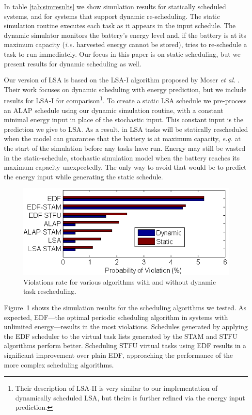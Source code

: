 In table \ref{tab:simresults} we show simulation results for statically scheduled systems, and for systems that support dynamic re-scheduling.  The static simulation routine executes each task as it appears in the input schedule.  The dynamic simulator monitors the battery's energy level and, if the battery is at its maximum capacity (\emph{i.e.} harvested energy cannot be stored), tries to re-schedule a task to run immediately.  Our focus in this paper is on static scheduling, but we present results for dynamic scheduling as well.

Our version of \textsc{LSA} is based on the \textsc{LSA-I} algorithm proposed by Moser \emph{et al.} \cite{moser2007real}.  Their work focuses on dynamic scheduling with energy prediction, but we include results for \textsc{LSA-I} for comparison\footnote{Their description of \textsc{LSA-II} is very similar to our implementation of dynamically scheduled \textsc{LSA}, but theirs is further refined via the energy input prediction.}.  To create a static \textsc{LSA} schedule we pre-process an \textsc{ALAP} schedule using our dynamic simulation routine, with a constant minimal energy input in place of the stochastic input.  This constant input is the prediction we give to \textsc{LSA}.  As a result, in \textsc{LSA} tasks will be statically rescheduled when the model can guarantee that the battery is at maximum capacity, \emph{e.g.} at the start of the simulation before any tasks have run.  Energy may still be wasted in the static-schedule, stochastic simulation model when the battery reaches its maximum capacity unexpectedly.  The only way to avoid that would be to predict the energy input while generating the static schedule.
\begin{figure}[htb]
\begin{center}
\includegraphics[scale=0.65]{bar.png}
\end{center}
\label{fig:simresults}
\caption{Violations rate for various algorithms with and without dynamic task rescheduling.}
\end{figure}
Figure~\ref{fig:simresults} shows the simulation results for the scheduling algorithms we tested.  As expected, \textsc{EDF}---the optimal periodic scheduling algorithm in systems with unlimited energy---results in the most violations.  Schedules generated by applying the \textsc{EDF} scheduler to the virtual task lists generated by the \textsc{STAM} and \textsc{STFU} algorithms perform better.  Scheduling \textsc{STFU} virtual tasks using \textsc{EDF} results in a significant improvement over plain \textsc{EDF}, approaching the performance of the more complex scheduling algorithms.

